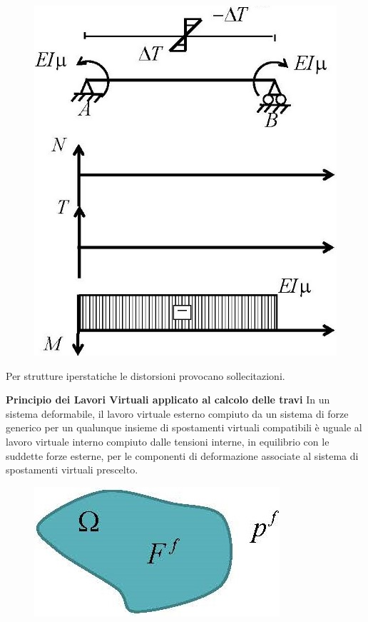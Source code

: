 \documentclass{article}
\begin{document}
\begin{adjustwidth}{2in}{}
\begin{figure}[H]
	\centering
	\includegraphics[width=0.4\linewidth]{"immagini/1.PARTE8_Pagina_60"}	
\end{figure} 
		
		Per strutture iperstatiche le distorsioni provocano
		sollecitazioni. \newline 
		
{\Large \textbf{Principio dei Lavori Virtuali applicato al calcolo delle travi}} \newline 
		In un sistema deformabile, il lavoro virtuale esterno compiuto da un sistema di forze generico per
		un qualunque insieme di spostamenti virtuali compatibili è uguale al lavoro virtuale interno
		compiuto dalle tensioni interne, in equilibrio con le suddette forze esterne, per le componenti di
		deformazione associate al sistema di spostamenti virtuali prescelto.
		
\begin{figure}[H]
	\centering
	\includegraphics[width=0.25\linewidth]{"immagini/1.PARTE8_Pagina_61"}	
\end{figure}


\end{adjustwidth}
\end{document}
